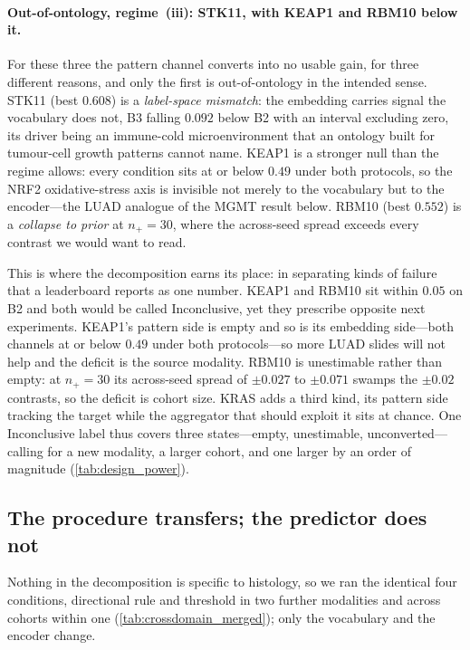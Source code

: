 \paragraph{Out-of-ontology, regime~(iii): STK11, with KEAP1 and RBM10
below it.} For these three the pattern channel converts into no usable
gain, for three different reasons, and only the first is
out-of-ontology in the intended sense. STK11 (best $0.608$) is a
\emph{label-space mismatch}: the embedding carries signal the vocabulary
does not, B3 falling $0.092$ below B2 with an interval excluding zero,
its driver being an immune-cold
microenvironment\cite{skoulidis2018stk11pd1} that an ontology built for
tumour-cell growth patterns cannot name. KEAP1 is a stronger null than
the regime allows: every condition sits at or below $0.49$ under both
protocols, so the NRF2 oxidative-stress
axis\cite{li2011keap1papillary} is invisible not merely to the
vocabulary but to the encoder---the LUAD analogue of the MGMT result
below. RBM10 (best $0.552$) is a \emph{collapse to prior} at
$n_+\!=\!30$, where the across-seed spread exceeds every contrast we
would want to read.

This is where the decomposition earns its place: in separating kinds of
failure that a leaderboard reports as one number. KEAP1 and RBM10 sit
within $0.05$ \auroc{} on B2 and both would be called
Inconclusive, yet they prescribe opposite next experiments. KEAP1's
pattern side is empty and so is its embedding side---both channels at or
below $0.49$ under both protocols---so more LUAD slides will not help
and the deficit is the source modality. RBM10 is unestimable rather than
empty: at $n_+\!=\!30$ its across-seed spread of $\pm0.027$ to
$\pm0.071$ swamps the $\pm0.02$ contrasts, so the deficit is cohort
size. KRAS adds a third kind, its pattern side
tracking the target while the aggregator that should exploit it sits at
chance. One Inconclusive label thus covers three states---empty,
unestimable, unconverted---calling for a new modality, a larger cohort,
and one larger by an order of magnitude (\cref{tab:design_power}).

\subsection*{The procedure transfers; the predictor does not}

Nothing in the decomposition is specific to histology, so we ran the
identical four conditions, directional rule and threshold in two further
modalities and across cohorts within one
(\cref{tab:crossdomain_merged}); only the vocabulary and the encoder
change.

